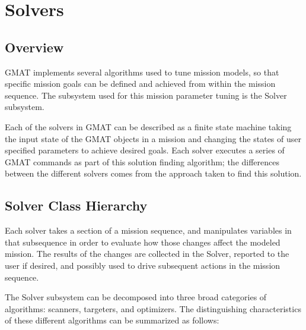 \chapter{\label{chapter:Solvers}Solvers}

\section{Overview}

GMAT implements several algorithms used to tune mission models, so that specific mission goals can
be defined and achieved from within the mission sequence.  The subsystem used for this mission
parameter tuning is the Solver subsystem.

Each of the solvers in GMAT can be described as a finite state machine taking the input state of
the GMAT objects in a mission and changing the states of user specified parameters to achieve
desired goals.  Each solver executes a series of GMAT commands as part of this solution finding
algorithm; the differences between the different solvers comes from the approach taken to find
this solution.

\section{Solver Class Hierarchy}

Each solver takes a section of a mission sequence, and manipulates variables in that subsequence in
order to evaluate how those changes affect the modeled mission.  The results of the changes are
collected in the Solver, reported to the user if desired, and possibly used to drive subsequent
actions in the mission sequence.

The Solver subsystem can be decomposed into three broad categories of algorithms: scanners,
targeters, and optimizers.  The distinguishing characteristics of these different algorithms can be
summarized as follows:

